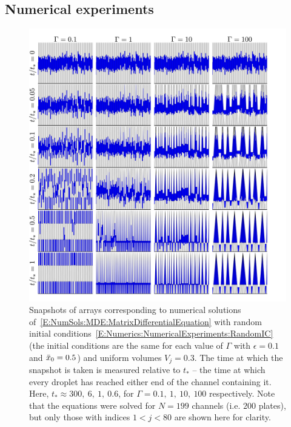\subsection{Numerical experiments}\label{S:Numerics:NumericalExperiments}
\begin{figure}[h!]
\centering
\includegraphics[width = \textwidth]{Snapshots.pdf}
\caption{Snapshots of arrays corresponding to numerical solutions of~\eqref{E:NumSols:MDE:MatrixDifferentialEquation} with random initial conditions~\eqref{E:Numerics:NumericalExperiments:RandomIC} (the initial conditions are the same for each value of $\Gamma$ with $\epsilon = 0.1$ and $\bar{x}_0 = 0.5$) and uniform volumes $V_j = 0.3$. The time at which the snapshot is taken is measured relative to $t_*$ -- the time at which every droplet has reached either end of the channel containing it. Here, $t_* \approx 300,~6,~1,~0.6$, for $\Gamma = 0.1,~1,~10,~100$ respectively. Note that the equations were solved for $N=199$ channels (i.e. $200$ plates), but only those with indices $1 < j < 80$ are shown here for clarity.}\label{fig:Numerics:Snapshots}
\end{figure}

